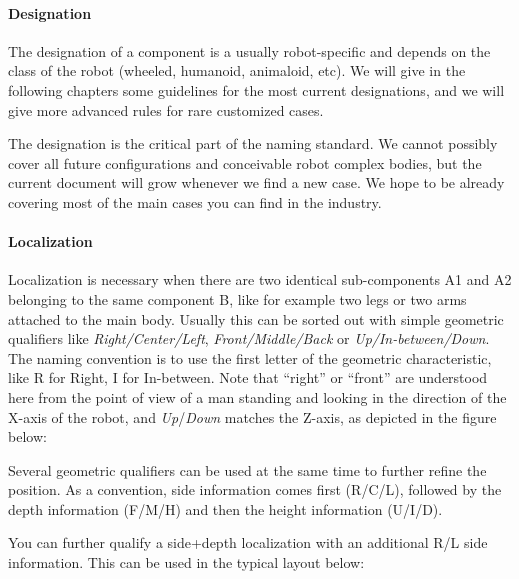 \documentclass[a4paper]{article}
\begin{document}
\paragraph{Designation}

{\sffamily
The designation of a component is a usually robot-specific and depends
on the class of the robot (wheeled, humanoid, animaloid, etc). We will
give in the following chapters some guidelines for the most current
designations, and we will give more advanced rules for rare customized
cases. }

{\sffamily
The designation is the critical part of the naming standard. We cannot
possibly cover all future configurations and conceivable robot complex
bodies, but the current document will grow whenever we find a new case.
We hope to be already covering most of the main cases you can find in
the industry.}

\paragraph{Localization }

{
\textsf{Localization is necessary when there are two identical
sub-components A1 and A2 belonging to the same component B, like for
example two legs or two arms attached to the main body. Usually this
can be sorted out with simple geometric qualifiers like
}\textsf{\textit{Right/Center/Left}}\textsf{,
}\textsf{\textit{Front/Middle/Back}}\textsf{ or
}\textsf{\textit{Up}}\textsf{\textit{/In-between/Down}}\textsf{. The
naming convention is to use the first letter of the geometric
characteristic, like }R\textsf{ for Right, }I\textsf{ for In-between.
Note that “right” or “front” are understood here from the point of view
of a man standing and looking in the direction of the X-axis of the
robot, and
}\textsf{\textit{Up}}\textsf{/}\textsf{\textit{Down}}\textsf{ matches
the Z-axis, as depicted in the figure below:}}

{\par}

{
\textsf{Several geometric qualifiers can be used at the same time to
further refine the position. As a convention, side information comes
first (}R\textsf{/}C\textsf{/}L\textsf{), followed by the depth
information (}F\textsf{/}M\textsf{/}H\textsf{) and then the height
information (}U\textsf{/}I\textsf{/}D\textsf{). }}

{\sffamily
You can further qualify a side+depth localization with an additional R/L
side information. This can be used in the typical layout below:}
\end{document}
